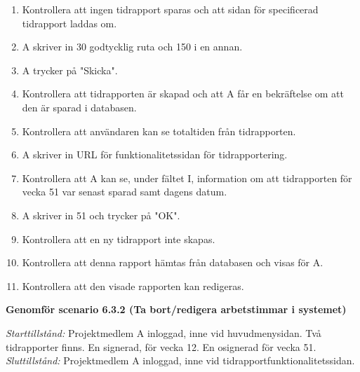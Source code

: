 \documentclass[a4paper]{article}
\begin{document}
\begin{ST}
\begin{enumerate}
\item Kontrollera att ingen tidrapport sparas och att sidan för specificerad tidrapport laddas om.
\item A skriver in 30 godtycklig ruta och 150 i en annan.
\item A trycker på "Skicka".
\item Kontrollera att tidrapporten är skapad och att A får en bekräftelse om att den är sparad i databasen.
\item Kontrollera att användaren kan se totaltiden från tidrapporten.
\item A skriver in URL för funktionalitetssidan för tidrapportering.
\item Kontrollera att A kan se, under fältet I, information om att tidrapporten för vecka 51 var senast sparad samt dagens datum.
\item A skriver in 51 och trycker på "OK".
\item Kontrollera att en ny tidrapport inte skapas.
\item Kontrollera att denna rapport hämtas från databasen och visas för A.
\item Kontrollera att den visade rapporten kan redigeras.

\end{enumerate}



\item
\textbf{Genomför scenario 6.3.2 (Ta bort/redigera arbetstimmar i systemet)}

\emph{Starttillstånd:} Projektmedlem A inloggad, inne vid huvudmenysidan. Två tidrapporter finns. En signerad, för vecka 12. En osignerad för vecka 51.\\
\emph{Sluttillstånd:} Projektmedlem A inloggad, inne vid tidrapportfunktionalitetssidan.\\


\end{ST}
\end{document}
